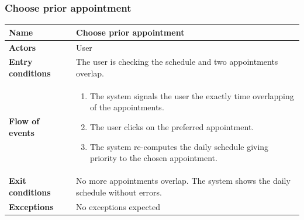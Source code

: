 \subsubsection{Choose prior appointment}
\begin{table}[!h]
	\centering
	{\renewcommand{\arraystretch}{2}%
		\begin{tabular}{|l|p{12cm}|}
			\hline
			\textbf{Name} 				& \textbf{Choose prior appointment} \\ \hline
			\textbf{Actors} 			& User \\ \hline
			\textbf{Entry conditions} 	& The user is checking the schedule and two appointments overlap. \\ \hline
			\textbf{Flow of events}		& \begin{minipage}[t]{0.75\textwidth}
				\begin{enumerate}
					\item The system signals the user the exactly time overlapping of the appointments.
					\item The user clicks on the preferred appointment.
					\item The system re-computes the daily schedule giving priority to the chosen appointment.
				\end{enumerate}
			\end{minipage}	\\ \hline
			\textbf{Exit conditions}	& No more appointments overlap. The system shows the daily schedule without errors.  \\ \hline
			\textbf{Exceptions}			& No exceptions expected  \\ \hline
	\end{tabular}}
\end{table}
\clearpage

